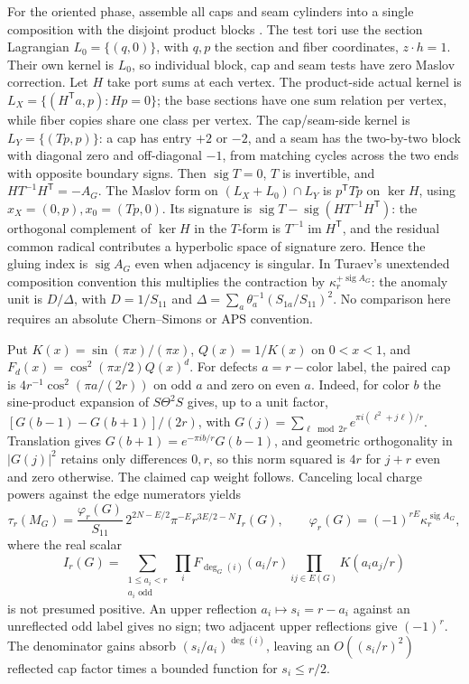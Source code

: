 \documentclass[11pt]{article}
\theoremstyle{definition}
\DeclareMathOperator{\sig}{sig}
\begin{document}
For the oriented phase, assemble all caps and seam cylinders into a single composition with the disjoint product blocks \cite{BHMV,GM,Turaev}. The test tori use the section Lagrangian \(L_0=\{(q,0)\}\), with \(q,p\) the section and fiber coordinates, \(z\cdot h=1\). Their own kernel is \(L_0\), so individual block, cap and seam tests have zero Maslov correction. Let \(H\) take port sums at each vertex. The product-side actual kernel is \(L_X=\{(H^{\mathsf T}a,p):Hp=0\}\); the base sections have one sum relation per vertex, while fiber copies share one class per vertex. The cap/seam-side kernel is \(L_Y=\{(Tp,p)\}\): a cap has entry \(+2\) or \(-2\), and a seam has the two-by-two block with diagonal zero and off-diagonal \(-1\), from matching cycles across the two ends with opposite boundary signs. Then \(\sig T=0\), \(T\) is invertible, and \(HT^{-1}H^{\mathsf T}=-A_G\). The Maslov form on \((L_X+L_0)\cap L_Y\) is \(p^{\mathsf T}T\tilde p\) on \(\ker H\), using \(x_X=(0,p),x_0=(Tp,0)\). Its signature is \(\sig T-\sig(HT^{-1}H^{\mathsf T})\): the orthogonal complement of \(\ker H\) in the \(T\)-form is \(T^{-1}\operatorname{im}H^{\mathsf T}\), and the residual common radical contributes a hyperbolic space of signature zero. Hence the gluing index is \(\sig A_G\) even when adjacency is singular. In Turaev's unextended composition convention this multiplies the contraction by \(\kappa_r^{+\sig A_G}\): the anomaly unit is \(D/\Delta\), with \(D=1/S_{11}\) and \(\Delta=\sum_a\theta_a^{-1}(S_{1a}/S_{11})^2\). No comparison here requires an absolute Chern--Simons or APS convention.

Put \(K(x)=\sin(\pi x)/(\pi x)\), \(Q(x)=1/K(x)\) on \(0<x<1\), and \(F_d(x)=\cos^2(\pi x/2)Q(x)^d\). For defects \(a=r-\text{color label}\), the paired cap is \(4r^{-1}\cos^2(\pi a/(2r))\) on odd \(a\) and zero on even \(a\). Indeed, for color \(b\) the sine-product expansion of \(S\Theta^2S\) gives, up to a unit factor, \([G(b-1)-G(b+1)]/(2r)\), with \(G(j)=\sum_{\ell\bmod 2r}e^{\pi i(\ell^2+j\ell)/r}\). Translation gives \(G(b+1)=e^{-\pi i b/r}G(b-1)\), and geometric orthogonality in \(|G(j)|^2\) retains only differences \(0,r\), so this norm squared is \(4r\) for \(j+r\) even and zero otherwise. The claimed cap weight follows.
Canceling local charge powers against the edge numerators yields
\begin{equation}\label{eq:wrt}
 \tau_r(M_G)=\frac{\varphi_r(G)}{S_{11}}\,
 2^{2N-E/2}\pi^{-E}r^{3E/2-N} I_r(G),\qquad
 \varphi_r(G)=(-1)^{rE}\kappa_r^{\sig A_G},
\end{equation}
where the real scalar
\[
 I_r(G)=\sum_{\substack{1\le a_i<r\\a_i\text{ odd}}}
       \prod_i F_{\deg_G(i)}(a_i/r)\prod_{ij\in E(G)}K(a_i a_j/r)
\]
is not presumed positive. An upper reflection \(a_i\mapsto s_i=r-a_i\) against an unreflected odd label gives no sign; two adjacent upper reflections give \((-1)^r\). The denominator gains absorb \((s_i/a_i)^{\deg(i)}\), leaving an \(O((s_i/r)^2)\) reflected cap factor times a bounded function for \(s_i\le r/2\).
\end{document}
